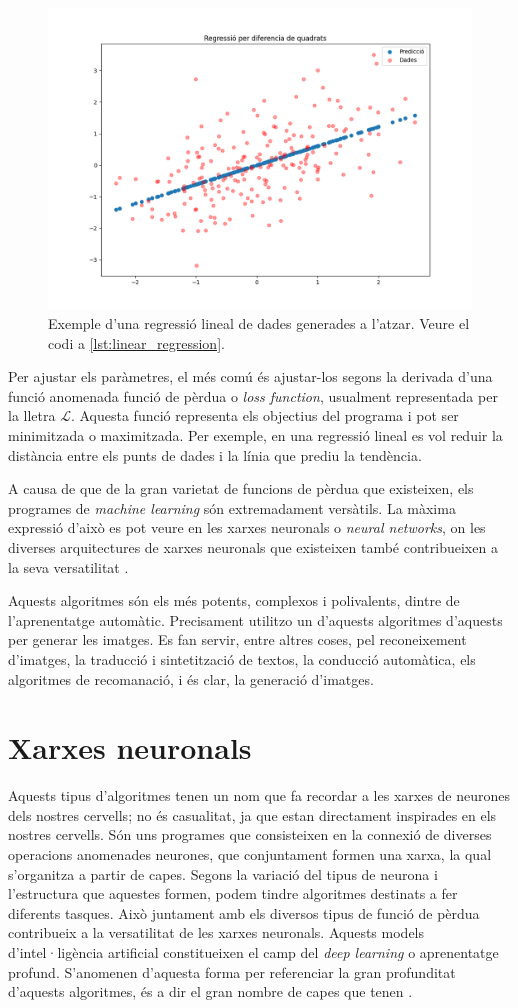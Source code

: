 \begin{figure}
	\centering
	\includegraphics[width=0.7\linewidth]{Figures/least_squares}
	\caption{Exemple d'una regressió lineal de dades generades a l'atzar. Veure el codi a \ref{lst:linear_regression}.}
	\label{fig:leastsquares}
\end{figure}

Per ajustar els paràmetres, el més comú és ajustar-los segons la derivada d'una funció anomenada funció de pèrdua o \textit{loss function}, usualment representada per la lletra $\mathcal{L}$. Aquesta funció representa els objectius del programa i pot ser minimitzada o maximitzada. Per exemple, en una regressió lineal es vol reduir la distància entre els punts de dades i la línia que prediu la tendència.

A causa de que de la gran varietat de funcions de pèrdua que existeixen, els programes de \textit{machine learning} són extremadament versàtils. La màxima expressió d'això es pot veure en les xarxes neuronals o \textit{neural networks}, on les diverses arquitectures de xarxes neuronals que existeixen també contribueixen a la seva versatilitat \cite{deeplearning}. 

Aquests algoritmes són els més potents, complexos i polivalents, dintre de l'aprenentatge automàtic. Precisament utilitzo un d'aquests algoritmes d'aquests per generar les imatges. Es fan servir, entre altres coses, pel reconeixement d'imatges, la traducció i sintetització de textos, la conducció automàtica, els algoritmes de recomanació, i és clar, la generació d'imatges.

\section{Xarxes neuronals}
Aquests tipus d'algoritmes tenen un nom que fa recordar a les xarxes de neurones dels nostres cervells; no és casualitat, ja que estan directament inspirades en els nostres cervells. Són uns programes que consisteixen en la connexió de diverses operacions anomenades neurones, que conjuntament formen una xarxa, la qual s'organitza a partir de capes. Segons la variació del tipus de neurona i l'estructura que aquestes formen, podem tindre algoritmes destinats a fer diferents tasques. Això juntament amb els diversos tipus de funció de pèrdua contribueix a la versatilitat de les xarxes neuronals. Aquests models d'intel·ligència artificial constitueixen el camp del \textit{deep learning} o aprenentatge profund. S'anomenen d'aquesta forma per referenciar la gran profunditat d'aquests algoritmes, és a dir el gran nombre de capes que tenen \cite{DL:feedforward}.

